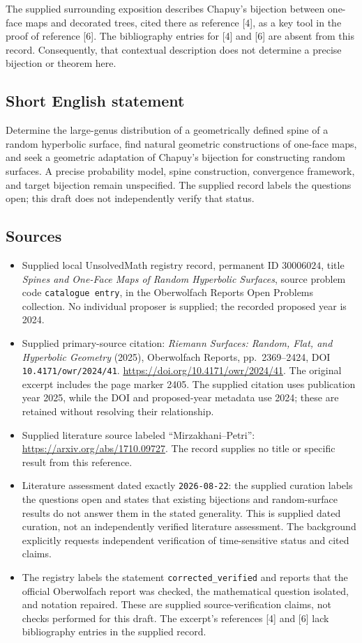 \documentclass[11pt]{article}
\begin{document}
The supplied surrounding exposition describes Chapuy's bijection between one-face maps and decorated trees, cited there as reference [4], as a key tool in the proof of reference [6]. The bibliography entries for [4] and [6] are absent from this record. Consequently, that contextual description does not determine a precise bijection or theorem here.
\subsection{Short English statement}
Determine the large-genus distribution of a geometrically defined spine of a random hyperbolic surface, find natural geometric constructions of one-face maps, and seek a geometric adaptation of Chapuy's bijection for constructing random surfaces. A precise probability model, spine construction, convergence framework, and target bijection remain unspecified. The supplied record labels the questions open; this draft does not independently verify that status.
\subsection{Sources}
\begin{itemize}
\item Supplied local UnsolvedMath registry record, permanent ID \(30006024\), title \emph{Spines and One-Face Maps of Random Hyperbolic Surfaces}, source problem code \texttt{catalogue entry}, in the Oberwolfach Reports Open Problems collection. No individual proposer is supplied; the recorded proposed year is 2024.
\item Supplied primary-source citation: \emph{Riemann Surfaces: Random, Flat, and Hyperbolic Geometry} (2025), Oberwolfach Reports, pp.\ 2369--2424, DOI \texttt{10.4171/owr/2024/41}. \url{https://doi.org/10.4171/owr/2024/41}. The original excerpt includes the page marker 2405. The supplied citation uses publication year 2025, while the DOI and proposed-year metadata use 2024; these are retained without resolving their relationship.
\item Supplied literature source labeled ``Mirzakhani--Petri'': \url{https://arxiv.org/abs/1710.09727}. The record supplies no title or specific result from this reference.
\item Literature assessment dated exactly \texttt{2026-08-22}: the supplied curation labels the questions open and states that existing bijections and random-surface results do not answer them in the stated generality. This is supplied dated curation, not an independently verified literature assessment. The background explicitly requests independent verification of time-sensitive status and cited claims.
\item The registry labels the statement \texttt{corrected\_verified} and reports that the official Oberwolfach report was checked, the mathematical question isolated, and notation repaired. These are supplied source-verification claims, not checks performed for this draft. The excerpt's references [4] and [6] lack bibliography entries in the supplied record.
\end{itemize}
\end{document}
